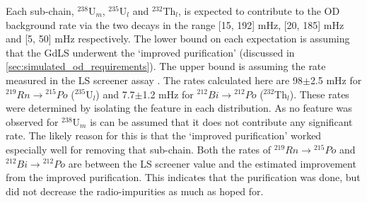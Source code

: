 \par
Each sub-chain, ${}^{238}$U$_{m}$, ${}^{235}$U$_{l}$ and ${}^{232}$Th$_{l}$, is expected to contribute to the OD background rate via the two decays in the range [15, 192] mHz, [20, 185] mHz and [5, 50] mHz respectively.
The lower bound on each expectation is assuming that the GdLS underwent the `improved purification' (discussed in \autoref{sec:simulated_od_requirements}).
The upper bound is assuming the rate measured in the LS screener assay \cite{scotthaselschwardt_thesis_ref}.
The rates calculated here are 98$\pm$2.5 mHz for ${}^{219}Rn \to {}^{215}Po$ (${}^{235}$U$_{l}$) and 7.7$\pm$1.2 mHz for ${}^{212}Bi \to {}^{212}Po$ (${}^{232}$Th$_{l}$).
These rates were determined by isolating the feature in each distribution.
As no feature was observed for ${}^{238}$U$_{m}$ is can be assumed that it does not contribute any significant rate.
The likely reason for this is that the `improved purification' worked especially well for removing that sub-chain.
Both the rates of ${}^{219}Rn \to {}^{215}Po$ and ${}^{212}Bi \to {}^{212}Po$ are between the LS screener value and the estimated improvement from the improved purification.
This indicates that the purification was done, but did not decrease the radio-impurities as much as hoped for.

